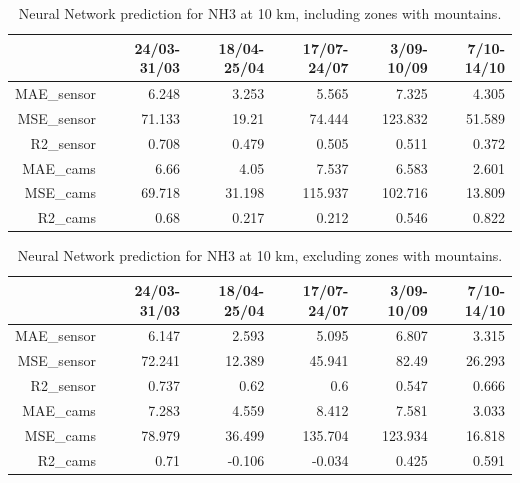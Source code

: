 \begin{table}[H]
\begin{tabular}{rrrrrr}
\hline
    &   24/03-31/03 &   18/04-25/04 &   17/07-24/07 &   3/09-10/09 &   7/10-14/10 \\
\hline
  MAE\_sensor   &            6.248 &            3.253 &            5.565 &            7.325 &            4.305 \\
  MSE\_sensor   &           71.133 &           19.21  &           74.444 &          123.832 &           51.589 \\
  R2\_sensor    &            0.708 &            0.479 &            0.505 &            0.511 &            0.372 \\
  MAE\_cams     &            6.66  &            4.05  &            7.537 &            6.583 &            2.601 \\
 MSE\_cams     &           69.718 &           31.198 &          115.937 &          102.716 &           13.809 \\
  R2\_cams      &            0.68  &            0.217 &            0.212 &            0.546 &            0.822 \\
\hline
\end{tabular}
\caption{Neural Network prediction for NH3 at 10 km, including zones with mountains.}
\end{table}

\begin{table}[H]
\begin{tabular}{rrrrrr}
\hline
    &   24/03-31/03 &   18/04-25/04 &   17/07-24/07 &   3/09-10/09 &   7/10-14/10 \\
\hline
   MAE\_sensor   &            6.147 &            2.593 &            5.095 &            6.807 &            3.315 \\
  MSE\_sensor   &           72.241 &           12.389 &           45.941 &           82.49  &           26.293 \\
  R2\_sensor    &            0.737 &            0.62  &            0.6   &            0.547 &            0.666 \\
  MAE\_cams     &            7.283 &            4.559 &            8.412 &            7.581 &            3.033 \\
  MSE\_cams     &           78.979 &           36.499 &          135.704 &          123.934 &           16.818 \\
  R2\_cams      &            0.71  &           -0.106 &           -0.034 &            0.425 &            0.591 \\
\hline
\end{tabular}
\caption{Neural Network prediction for NH3 at 10 km, excluding zones with mountains.}
\end{table}

